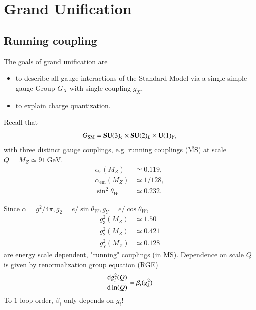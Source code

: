 \chapter{Grand Unification} 
\section{Running coupling}
The goals of grand unification are
\begin{itemize}
   \item to describe all gauge interactions of the Standard Model via a single simple gauge Group $G_X$ with single coupling $g_X$,
   \item to explain charge quantization.
\end{itemize}

Recall that 
\begin{equation}
  G_\text{SM} = \mathbf{SU}(3)_\text{c} \times \mathbf{SU}(2)_L \times \mathbf{U}(1)_Y,
\end{equation}
with three distinct gauge couplings, e.g. running couplings ($\overline{\text{MS}}$) at scale $Q = M_Z \simeq \SI{91}{\giga\eV}$.
\begin{subequations}
   \label{2.2}
\begin{align}
   \alpha_\text{s} (M_Z) &\simeq \num{0.119} \label{2.2a},\\
   \alpha_\text{em}(M_Z) &\simeq 1/128 \label{2.2b},\\
   \sin^2 \theta_W &\simeq \num{0.232} \label{2.2c}.
\end{align}
\end{subequations}

Since $\alpha = g^2 / 4\pi, g_2 = e/ \sin\theta_W, g_Y = e/ \cos\theta_W$,
\begin{subequations}
   \label{2.3}
\begin{align}
   g_3^2 (M_Z) &\simeq \num{1.50} \label{2.3a} \\
   g_2^2 (M_Z) &\simeq \num{0.421} \label{2.3b} \\
   g_Y^2 (M_Z) &\simeq \num{0.128} \label{2.3c}
\end{align}
\end{subequations}
are energy scale dependent, "running" couplings (in $\overline{\text{MS}}$). Dependence on scale $Q$ is given by renormalization group equation (RGE)
\begin{equation}
   \dv{g_i^2 (Q)}{\ln(Q)} = \beta_i (g_k^2)
\end{equation}
To $1$-loop order, $\beta_i$ only depends on $g_i$!

